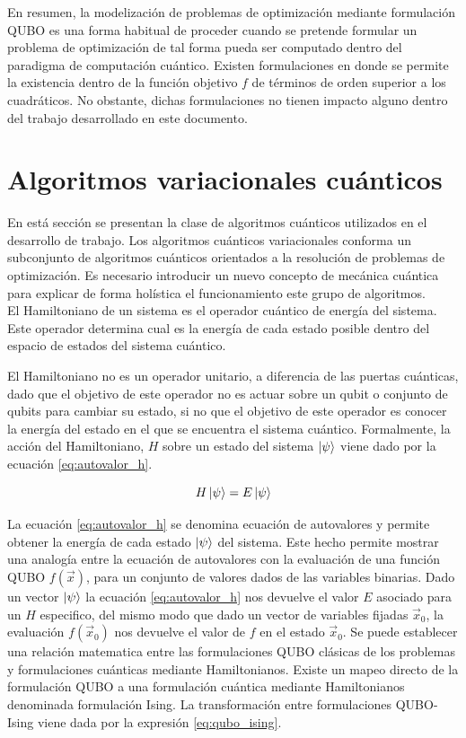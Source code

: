 En resumen, la modelización de problemas de optimización mediante formulación QUBO es una forma habitual de proceder cuando se pretende formular un problema de optimización de tal forma pueda ser computado dentro del paradigma de computación cuántico. Existen formulaciones en donde se permite la existencia dentro de la función objetivo $f$ de términos de orden superior a los cuadráticos. No obstante, dichas formulaciones no tienen impacto alguno dentro del trabajo desarrollado en este documento.


\section{Algoritmos variacionales cuánticos}

En está sección se presentan la clase de algoritmos cuánticos utilizados en el desarrollo de trabajo. Los algoritmos cuánticos variacionales conforma un subconjunto de algoritmos cuánticos orientados a la resolución de problemas de optimización. Es necesario introducir un nuevo concepto de mecánica cuántica para explicar de forma holística el funcionamiento este grupo de algoritmos.\\

El Hamiltoniano de un sistema es el operador cuántico de energía del sistema. Este operador determina cual es la energía de cada estado posible dentro del espacio de estados del sistema cuántico.

\newpage

El Hamiltoniano no es un operador unitario, a diferencia de las puertas cuánticas, dado que el objetivo de este operador no es actuar sobre un qubit o conjunto de qubits para cambiar su estado, si no que el objetivo de este operador es conocer la energía del estado en el que se encuentra el sistema cuántico. Formalmente, la acción del Hamiltoniano, $H$ sobre un estado del sistema $\ket{\psi}$ viene dado por la ecuación \ref{eq:autovalor_h}.

\begin{equation}
    H \ket{\psi} = E \ket{\psi}
    \label{eq:autovalor_h}
\end{equation}

La ecuación \ref{eq:autovalor_h} se denomina ecuación de autovalores y permite obtener la energía de cada estado $\ket{\psi}$ del sistema. Este hecho permite mostrar una analogía entre la ecuación de autovalores con la evaluación de una función QUBO $f(\Vec{x})$, para un conjunto de valores dados de las variables binarias. Dado un vector $\ket{\psi}$ la ecuación \ref{eq:autovalor_h} nos devuelve el valor $E$ asociado para un $H$ especifico, del mismo modo que dado un vector de variables fijadas $\Vec{x}_{0}$, la evaluación $f(\Vec{x}_0)$ nos devuelve el valor de $f$ en el estado $\Vec{x}_0$. Se puede establecer una relación matematica entre las formulaciones QUBO clásicas de los problemas y formulaciones cuánticas mediante Hamiltonianos. Existe un mapeo directo de la formulación QUBO a una formulación cuántica mediante Hamiltonianos denominada formulación Ising. La transformación entre formulaciones QUBO-Ising viene dada por la expresión \ref{eq:qubo_ising}.

